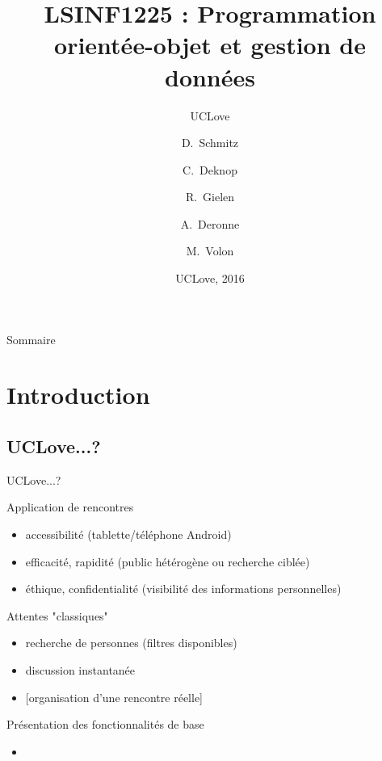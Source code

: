 \documentclass{beamer}
\title{LSINF1225 : Programmation orientée-objet et gestion de données}
\subtitle{UCLove}
\author{D.~Schmitz\inst{1} \and C.~Deknop\inst{2} \and R.~Gielen\inst{3} \and A.~Deronne\inst{4} \and M.~Volon\inst{5}}
\institute[Université de Louvain-la-Neuve] %
{
  \inst{1}%
  SINF11BA
  \and
  \inst{2}%
  SINF12BA
  \and
  \inst{3}%
  SINF12BA
  \and
  \inst{4}%
  SINF12BA
  \and
  \inst{5}%
  LING2MS/LA
  }
\date{UCLove, 2016}
\begin{document}
\begin{frame}
  \titlepage
\end{frame}

\begin{frame}{Sommaire}
  \tableofcontents
\end{frame}

\section{Introduction}

\subsection{UCLove...?}
\begin{frame}{UCLove...?}
\begin{block}{Application de rencontres}
	\begin{itemize}
		\item{
			accessibilité (tablette/téléphone Android)
		}
		\item{
			efficacité, rapidité (public hétérogène ou recherche ciblée)
		}
		\item{
			éthique, confidentialité (visibilité des informations personnelles)
		}
	\end{itemize}
\end{block}
\begin{block}{Attentes "classiques"}
	\begin{itemize}
		\item{
			recherche de personnes (filtres disponibles)
		}
		\item{
			discussion instantanée
		}
		\item{
			[organisation d'une rencontre réelle]
		}
	\end{itemize}
\end{block}
\begin{block}{Présentation des fonctionnalités de base}
\end{block}
\end{frame}

\begin{frame}
	\begin{itemize}
	
	\item{
	
	}
	\end{itemize}
\end{frame}
\end{document}
